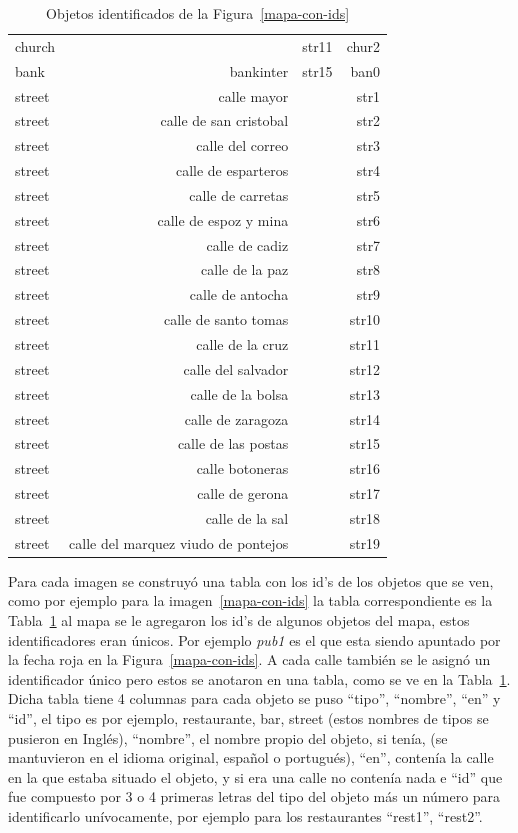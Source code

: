 \begin{table}[!t]
{\begin{center}
\begin{tabular}{|l|r|r|r|}
church & & str11 & chur2\\
bank & bankinter & str15 & ban0\\
street & calle mayor & & str1 \\
street & calle de san cristobal & & str2\\
street & calle del correo & & str3\\
street & calle de esparteros & & str4\\
street & calle de carretas & & str5\\
street & calle de espoz y mina & & str6\\
street & calle de cadiz & & str7\\
street & calle de la paz & & str8\\
street & calle de antocha & & str9\\
street & calle de santo tomas & & str10\\
street & calle de la cruz & & str11\\
street & calle del salvador & & str12\\
street & calle de la bolsa & & str13\\
street & calle de zaragoza & & str14\\
street & calle de las postas & & str15\\
street & calle botoneras & & str16\\
street & calle de gerona & & str17\\
street & calle de la sal & & str18\\
street & calle del marquez viudo de pontejos & & str19\\
\hline
\end{tabular}
\caption{Objetos identificados de la Figura~\ref{mapa-con-ids}\label{tabla-ids}}
\vspace*{-.5cm}
\end{center}
}
\end{table}

Para cada imagen se construy\'o una tabla con los id's de los objetos que se ven, como por ejemplo para la imagen~\ref{mapa-con-ids} la tabla correspondiente es la Tabla~\ref{tabla-ids} al mapa se le agregaron los id's de algunos objetos del mapa, estos identificadores eran \'unicos. Por ejemplo {\it pub1} es el que esta siendo apuntado por la fecha roja en la Figura~\ref{mapa-con-ids}. A cada calle tambi\'en se le asign\'o un identificador \'unico pero estos se anotaron en una tabla, como se ve en la Tabla~\ref{tabla-ids}. Dicha tabla tiene 4 columnas para cada objeto se puso ``tipo'', ``nombre'', ``en'' y ``id'', el tipo es por ejemplo, restaurante, bar, street (estos nombres de tipos se pusieron en Ingl\'es), ``nombre'', el nombre propio del objeto, si ten\'ia, (se mantuvieron en el idioma original, espa\~nol o portugu\'es), ``en'', conten\'ia la calle en la que estaba situado el objeto, y si era una calle no conten\'ia nada e ``id'' que fue compuesto por 3 o 4 primeras letras del tipo del objeto m\'as un n\'umero para identificarlo un\'ivocamente, por ejemplo para los restaurantes ``rest1'', ``rest2''.

